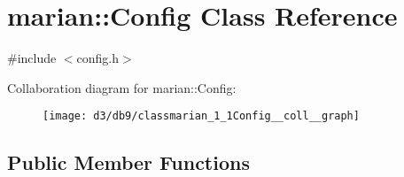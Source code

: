 \hypertarget{classmarian_1_1Config}{}\section{marian\+:\+:Config Class Reference}
\label{classmarian_1_1Config}


{\ttfamily \#include $<$config.\+h$>$}



Collaboration diagram for marian\+:\+:Config\+:
\nopagebreak
\begin{figure}[H]
\begin{center}
\leavevmode
\texttt{[image: d3/db9/classmarian\_1\_1Config\_\_coll\_\_graph]}
\end{center}
\end{figure}
\subsection*{Public Member Functions}
